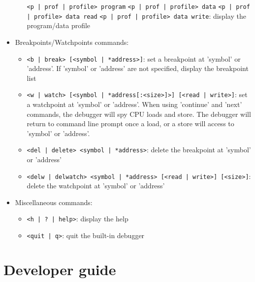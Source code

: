 \begin{itemize}
\begin{itemize}
	\texttt{<p | prof | profile> program} \newline
	\texttt{<p | prof | profile> data} \newline
	\texttt{<p | prof | profile> data read} \newline
	\texttt{<p | prof | profile> data write}: \newline
	display the program/data profile
	\end{itemize}
\item Breakpoints/Watchpoints commands:
	\begin{itemize}
	\item \texttt{<b | break> [<symbol | *address>]}: \newline
	set a breakpoint at 'symbol' or 'address'. If 'symbol' or 'address' are not specified, display the breakpoint list
	\item \texttt{<w | watch> [<symbol | *address[:<size>]>] [<read | write>]}: \newline
	set a watchpoint at 'symbol' or 'address'. When using 'continue' and 'next' commands, the debugger will spy CPU loads and store. The debugger will return to command line prompt once a load, or a store will access to 'symbol' or 'address'.
	\item \texttt{<del | delete> <symbol | *address>}: \newline
	delete the breakpoint at 'symbol' or 'address'
	\item \texttt{<delw | delwatch> <symbol | *address> [<read | write>] [<size>]}: \newline
	delete the watchpoint at 'symbol' or 'address'
	\end{itemize}
\item Miscellaneous commands:
	\begin{itemize}
	\item \texttt{<h | ? | help>}: \newline
	display the help
	\item \texttt{<quit | q>}: \newline
	quit the built-in debugger
	\end{itemize}
\end{itemize}

\newpage
\section{Developer guide}

